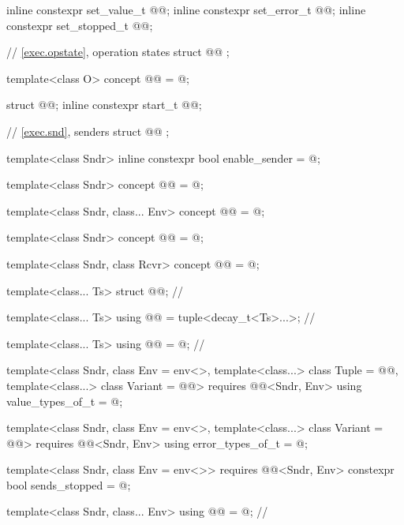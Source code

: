 \begin{codeblock}
{  inline constexpr set_value_t @@{};
  inline constexpr set_error_t @@{};
  inline constexpr set_stopped_t @@{};

  // \ref{exec.opstate}, operation states
  struct @@ {};

  template<class O>
    concept @@ = @\seebelow@;

  struct @@;
  inline constexpr start_t @@{};

  // \ref{exec.snd}, senders
  struct @@ {};

  template<class Sndr>
    inline constexpr bool enable_sender = @\seebelow@;

  template<class Sndr>
    concept @@ = @\seebelow@;

  template<class Sndr, class... Env>
    concept @@ = @\seebelow@;

  template<class Sndr>
    concept @@ = @\seebelow@;

  template<class Sndr, class Rcvr>
    concept @@ = @\seebelow@;

  template<class... Ts>
    struct @@;                                           // \expos

  template<class... Ts>
    using @@ = tuple<decay_t<Ts>...>;                // \expos

  template<class... Ts>
    using @@ = @\seebelownc@;                         // \expos

  template<class Sndr, class Env = env<>,
           template<class...> class Tuple = @@,
           template<class...> class Variant = @@>
      requires @@<Sndr, Env>
    using value_types_of_t = @\seebelow@;

  template<class Sndr, class Env = env<>,
           template<class...> class Variant = @@>
      requires @@<Sndr, Env>
    using error_types_of_t = @\seebelow@;

  template<class Sndr, class Env = env<>>
      requires @@<Sndr, Env>
    constexpr bool sends_stopped = @\seebelow@;

  template<class Sndr, class... Env>
    using @@ = @\seebelownc@;                 // \expos

}
\end{codeblock}
